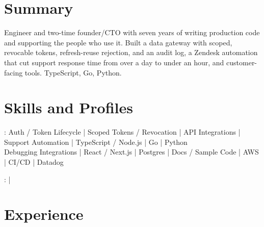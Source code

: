 \documentclass[print]{jack-resume}
\begin{document}
\pagecolor{darkmodeBackground}


\begin{minipage}[t][1cm][t]{.03\textwidth}
    \hfill
\end{minipage}

\section{Summary}
Engineer and two-time founder/CTO with seven years of writing production code and supporting the people who use it. Built a data gateway with scoped, revocable tokens, refresh-reuse rejection, and an audit log, a Zendesk automation that cut support response time from over a day to under an hour, and customer-facing tools. TypeScript, Go, Python.
\sectionsep

\section{Skills and Profiles}
:
Auth / Token Lifecycle \hfill | \hfill
Scoped Tokens / Revocation \hfill | \hfill
API Integrations \hfill | \hfill
Support Automation \hfill | \hfill
TypeScript / Node.js \hfill | \hfill
Go \hfill | \hfill
Python \\
\hspace{1.0cm} Debugging Integrations \hfill | \hfill
React / Next.js \hfill | \hfill
Postgres \hfill | \hfill
Docs / Sample Code \hfill | \hfill
AWS \hfill | \hfill
CI/CD \hfill | \hfill
Datadog \\

\raggedright{
    :
      \href{https://www.linkedin.com/in/jack-sturtevant/}{ \ExternalLink} |
     \href{https://github.com/jacksturt}{ \ExternalLink}}

\section{Experience}
\end{document}
